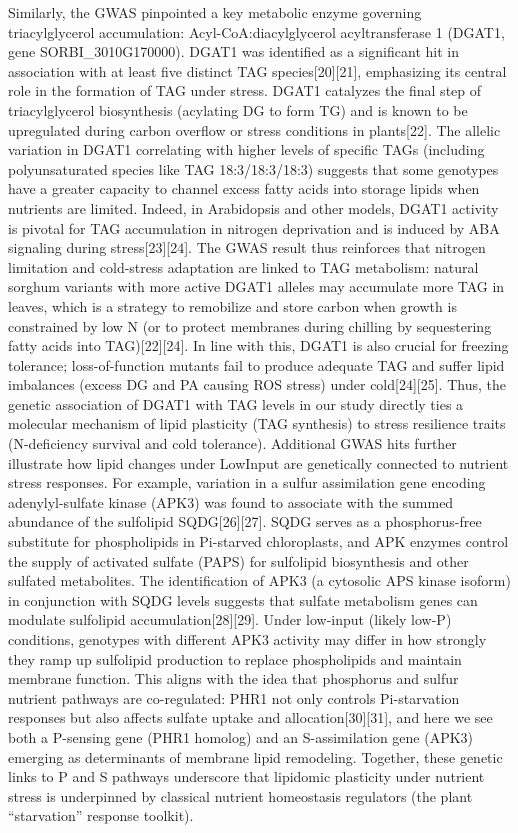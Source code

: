 \documentclass[10pt,letterpaper]{article}
\begin{document}
\begin{itemize}
Similarly, the GWAS pinpointed a key metabolic enzyme governing triacylglycerol accumulation: Acyl-CoA:diacylglycerol acyltransferase 1 (DGAT1, gene SORBI\_3010G170000). DGAT1 was identified as a significant hit in association with at least five distinct TAG species[20][21], emphasizing its central role in the formation of TAG under stress. DGAT1 catalyzes the final step of triacylglycerol biosynthesis (acylating DG to form TG) and is known to be upregulated during carbon overflow or stress conditions in plants[22]. The allelic variation in DGAT1 correlating with higher levels of specific TAGs (including polyunsaturated species like TAG 18:3/18:3/18:3) suggests that some genotypes have a greater capacity to channel excess fatty acids into storage lipids when nutrients are limited. Indeed, in Arabidopsis and other models, DGAT1 activity is pivotal for TAG accumulation in nitrogen deprivation and is induced by ABA signaling during stress[23][24]. The GWAS result thus reinforces that nitrogen limitation and cold-stress adaptation are linked to TAG metabolism: natural sorghum variants with more active DGAT1 alleles may accumulate more TAG in leaves, which is a strategy to remobilize and store carbon when growth is constrained by low N (or to protect membranes during chilling by sequestering fatty acids into TAG)[22][24]. In line with this, DGAT1 is also crucial for freezing tolerance; loss-of-function mutants fail to produce adequate TAG and suffer lipid imbalances (excess DG and PA causing ROS stress) under cold[24][25]. Thus, the genetic association of DGAT1 with TAG levels in our study directly ties a molecular mechanism of lipid plasticity (TAG synthesis) to stress resilience traits (N-deficiency survival and cold tolerance).
Additional GWAS hits further illustrate how lipid changes under LowInput are genetically connected to nutrient stress responses. For example, variation in a sulfur assimilation gene encoding adenylyl-sulfate kinase (APK3) was found to associate with the summed abundance of the sulfolipid SQDG[26][27]. SQDG serves as a phosphorus-free substitute for phospholipids in Pi-starved chloroplasts, and APK enzymes control the supply of activated sulfate (PAPS) for sulfolipid biosynthesis and other sulfated metabolites. The identification of APK3 (a cytosolic APS kinase isoform) in conjunction with SQDG levels suggests that sulfate metabolism genes can modulate sulfolipid accumulation[28][29]. Under low-input (likely low-P) conditions, genotypes with different APK3 activity may differ in how strongly they ramp up sulfolipid production to replace phospholipids and maintain membrane function. This aligns with the idea that phosphorus and sulfur nutrient pathways are co-regulated: PHR1 not only controls Pi-starvation responses but also affects sulfate uptake and allocation[30][31], and here we see both a P-sensing gene (PHR1 homolog) and an S-assimilation gene (APK3) emerging as determinants of membrane lipid remodeling. Together, these genetic links to P and S pathways underscore that lipidomic plasticity under nutrient stress is underpinned by classical nutrient homeostasis regulators (the plant “starvation” response toolkit).

\end{itemize}
\end{document}
